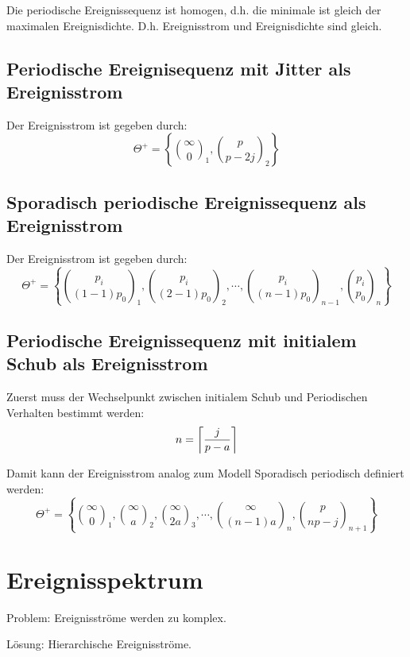 Die periodische Ereignissequenz ist homogen, d.h. die minimale ist gleich der maximalen
Ereignisdichte. D.h. Ereignisstrom und Ereignisdichte sind gleich.

\subsection{Periodische Ereignisequenz mit Jitter als Ereignisstrom}
Der Ereignisstrom ist gegeben durch:
\begin{equation}
    \Theta^+ = \left\{ \binom{\infty}{0}_1, \binom{p}{p-2j}_2 \right\}
\end{equation}

\subsection{Sporadisch periodische Ereignissequenz als Ereignisstrom}
Der Ereignisstrom ist gegeben durch:
\begin{equation}
    \Theta^+ = \left\{ \binom{p_i}{(1-1)p_0}_1, \binom{p_i}{(2-1)p_0}_2, \cdots, \binom{p_i}{(n-1)p_0}_{n-1}, 
        \binom{p_i}{p_0}_n \right\}
\end{equation}

\subsection{Periodische Ereignissequenz mit initialem Schub als Ereignisstrom}
Zuerst muss der Wechselpunkt zwischen initialem Schub und Periodischen Verhalten
bestimmt werden:
\begin{equation}
    n = \ceil*{\frac{j}{p-a}}
\end{equation}

Damit kann der Ereignisstrom analog zum Modell Sporadisch periodisch definiert werden:
\begin{equation}
    \Theta^+ = \left\{
        \binom{\infty}{0}_1,
        \binom{\infty}{a}_2,
        \binom{\infty}{2a}_3,
        \cdots,
        \binom{\infty}{(n-1)a}_n,
        \binom{p}{np-j}_{n+1}
        \right\}
\end{equation}


\section{Ereignisspektrum}
Problem: Ereignisströme werden zu komplex.

Lösung: Hierarchische Ereignisströme.

